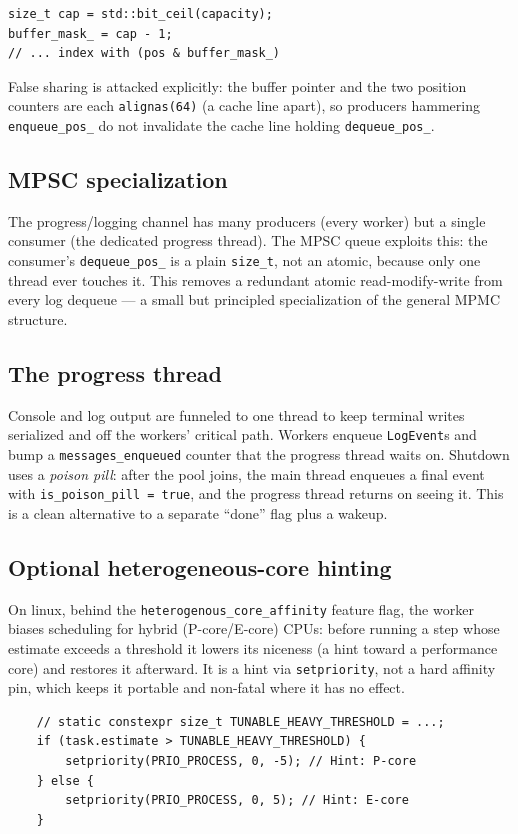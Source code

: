 \documentclass[11pt]{article}
\begin{document}
\begin{lstlisting}
size_t cap = std::bit_ceil(capacity);
buffer_mask_ = cap - 1;
// ... index with (pos & buffer_mask_)
\end{lstlisting}

False sharing is attacked explicitly: the buffer pointer and the two position
counters are each \lstinline|alignas(64)| (a cache line apart), so producers
hammering \lstinline|enqueue_pos_| do not invalidate the cache line holding
\lstinline|dequeue_pos_|.

\subsection{MPSC specialization}

The progress/logging channel has many producers (every worker) but a single
consumer (the dedicated progress thread). The MPSC queue exploits this: the
consumer's \lstinline|dequeue_pos_| is a plain \lstinline|size_t|, not an atomic,
because only one thread ever touches it. This removes a redundant atomic
read-modify-write from every log dequeue --- a small but principled
specialization of the general MPMC structure.

\subsection{The progress thread}

Console and log output are funneled to one thread to keep terminal writes
serialized and off the workers' critical path. Workers enqueue
\lstinline|LogEvent|s and bump a \lstinline|messages_enqueued| counter that the
progress thread waits on. Shutdown uses a \emph{poison pill}: after the pool
joins, the main thread enqueues a final event with
\lstinline|is_poison_pill = true|, and the progress thread returns on seeing it.
This is a clean alternative to a separate ``done'' flag plus a wakeup.

\subsection{Optional heterogeneous-core hinting}

On linux, behind the \lstinline|heterogenous_core_affinity| feature flag, the worker biases
scheduling for hybrid (P-core/E-core) CPUs: before running a step whose estimate
exceeds a threshold it lowers its niceness (a hint toward a performance core) and
restores it afterward. It is a hint via \lstinline|setpriority|, not a hard
affinity pin, which keeps it portable and non-fatal where it has no effect.
\begin{lstlisting}
    // static constexpr size_t TUNABLE_HEAVY_THRESHOLD = ...;
    if (task.estimate > TUNABLE_HEAVY_THRESHOLD) {
        setpriority(PRIO_PROCESS, 0, -5); // Hint: P-core
    } else {
        setpriority(PRIO_PROCESS, 0, 5); // Hint: E-core
    }
\end{lstlisting}
\end{document}
